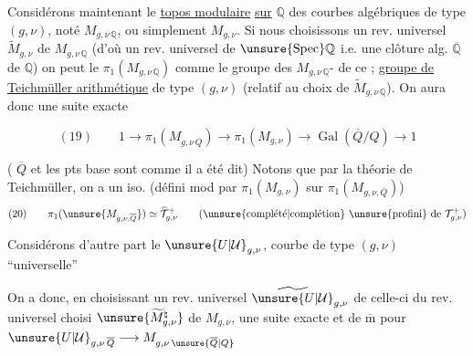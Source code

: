 Considérons maintenant le \uline{topos modulaire} \uline{sur} $\mathbb{Q}$ des courbes algébriques de type $(g,\nu)$, noté $M_{g,\nu\,\mathbb{Q}}$, ou simplement $M_{g,\nu}$. Si nous choisissons un rev. universel $\widetilde{M}_{g,\nu}$ de $M_{g,\nu\,\mathbb{Q}}$ (d'où un rev. universel de $\unsure{\operatorname{Spec}}\mathbb{Q}$ i.e. une clôture alg. $\overline{\mathbb{Q}}$ de $\mathbb{Q}$) on peut  le $\pi_1(M_{g,\nu\,\mathbb{Q}})$ comme le groupe des $M_{g,\nu\,\mathbb{Q}}$- de ce ;   \uline{groupe de Teichmüller arithmétique} de type $(g,\nu)$ (relatif au choix de $\widetilde{M}_{g,\nu\,\mathbb{Q}}$). On aura donc une suite exacte



\[
(19)\qquad 1\longrightarrow \pi_1(M_{g,\nu\,\overline{Q}})
\longrightarrow \pi_1(M_{g,\nu})
\longrightarrow \operatorname{Gal}(\overline{Q}/Q)\longrightarrow 1
\]

( $\overline{Q}$ et les pts base sont  comme il a été dit) Notons que par la théorie  de Teichmüller, on a un iso. (défini mod   par $\pi_1(M_{g,\nu})$ sur $\pi_1(M_{g,\nu,\overline{Q}})$)
\[
(20)\qquad \pi_1(\unsure{M_{g,\nu,\overline{Q}}})\simeq\widehat{\mathcal{T}}_{g,\nu}^{+}
\qquad (\text{\unsure{complété|complétion} \unsure{profini} de }\mathcal{T}_{g,\nu}^{+})
\]

Considérons d'autre part le  $\unsure{U|\mathcal{U}}_{g,\nu}$, courbe de type $(g,\nu)$ ``universelle''

On a donc, en choisissant un rev. universel $\widetilde{\unsure{U|\mathcal{U}}}_{g,\nu}$ de celle-ci \uline{} du rev. universel choisi $\unsure{\widetilde{M}_{g,\nu}^{\natural}}$ de $M_{g,\nu}$, une suite exacte
et de $\overline{\mathrm m}$ pour $\unsure{U|\mathcal{U}}_{g,\nu\,\overline{Q}}\longrightarrow M_{g,\nu\,\unsure{\overline{Q}|Q}}$

